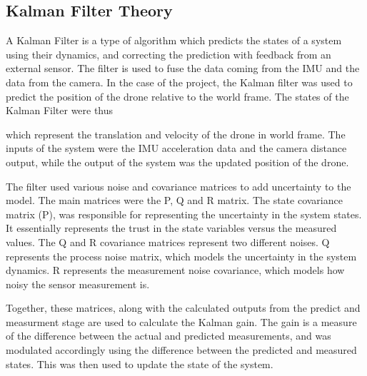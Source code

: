 \documentclass[bare_jrnl_transmag]{subfiles}
\begin{document}
\subsection{Kalman Filter Theory}
A Kalman Filter is a type of algorithm which predicts the states of a system using their dynamics, and correcting the prediction with feedback from an external sensor. The filter is used to fuse the data coming from the IMU and the data from the camera. 
In the case of the project, the Kalman filter was used to predict the position of the drone relative to the world frame. The states of the Kalman Filter were thus 

\begin{equation} 
    [ t_x, t_y, t_z, v_x, v_y, v_z ] 
\end{equation}  which represent the translation and velocity of the drone in world frame. 
The inputs of the system were the IMU acceleration data and the camera distance output, while the output of the system was the updated position of the drone.\newline

The filter used various noise and covariance matrices to add uncertainty to the model. The main matrices were the P, Q and R matrix. The state covariance matrix (P), was responsible for representing the uncertainty in the system states. It essentially represents the trust in the state variables versus the measured values.
The Q and R covariance matrices represent two different noises. Q represents the process noise matrix, which models the uncertainty in the system dynamics. R represents the measurement noise covariance, which models how noisy the sensor measurement is.\newline

Together, these matrices, along with the calculated outputs from the predict and measurment stage are used to calculate the Kalman gain. The gain is a measure of the difference between the actual and predicted measurements, and was modulated accordingly using the difference between the predicted and measured states. This was then used to update the state of the system.
\end{document}
